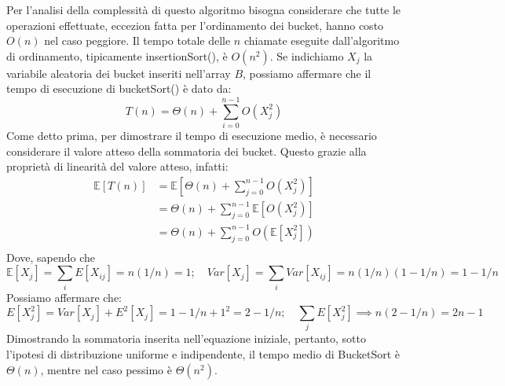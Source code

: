 \noindent Per l'analisi della complessità di questo algoritmo bisogna considerare che tutte le operazioni effettuate, eccezion fatta per l'ordinamento dei bucket, hanno costo $O(n)$ nel caso peggiore. Il tempo totale delle $n$ chiamate eseguite dall'algoritmo di ordinamento, tipicamente insertionSort(), è $O(n^2)$. Se indichiamo $X_j$ la variabile aleatoria dei bucket inseriti nell'array $B$, possiamo affermare che il tempo di esecuzione di bucketSort() è dato da: \[T(n) = \Theta(n) + \sum_{i=0}^{n-1} O(X_j^2)\]
\noindent Come detto prima, per dimostrare il tempo di esecuzione medio, è necessario considerare il valore atteso della sommatoria dei bucket. Questo grazie alla proprietà di linearità del valore atteso, infatti: \begin{equation}
	\begin{split}
		\mathbb{E}[T(n)] &= \mathbb{E}\left[\Theta(n) + \sum_{j=0}^{n-1} O(X_j^2) \right]\\
			&= \Theta(n) + \sum_{j=0}^{n-1} \mathbb{E}[O(X_j^2)]\\
			&= \Theta(n) + \sum_{j=0}^{n-1} O(\mathbb{E}[X_j^2])\\
	\end{split}
\end{equation}
\noindent Dove, sapendo che \[\mathbb{E}[X_j] = \sum_i E[X_{ij}] = n(1/n) = 1;\quad Var[X_j] = \sum_i Var[X_{ij}] = n(1/n)(1 - 1/n) = 1 - 1/n\]
\noindent Possiamo affermare che: \[E[X_j^2] = Var[X_j] + E^2[X_j] = 1 - 1/n + 1^2 = 2 - 1/n;\quad \sum_j E[X_j^2] \implies n(2 - 1/n) = 2n - 1\]
\noindent Dimostrando la sommatoria inserita nell'equazione iniziale, pertanto, sotto l’ipotesi di distribuzione uniforme e indipendente, il tempo medio di BucketSort è $\Theta(n)$, mentre nel caso pessimo è $\Theta(n^2)$.

%

